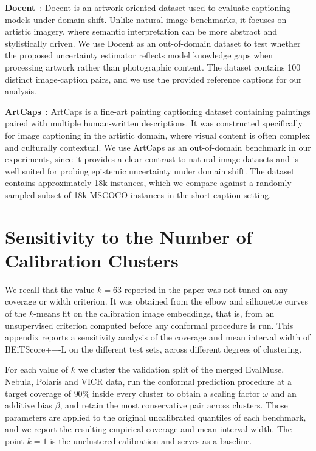 \documentclass[11pt]{article}
\begin{document}
\textbf{Docent}~\cite{ananthram2025posh}:
Docent is an artwork-oriented dataset used to evaluate captioning models under domain shift. Unlike natural-image benchmarks, it focuses on artistic imagery, where semantic interpretation can be more abstract and stylistically driven. We use Docent as an out-of-domain dataset to test whether the proposed uncertainty estimator reflects model knowledge gaps when processing artwork rather than photographic content. The dataset contains 100 distinct image-caption pairs, and we use the provided reference captions for our analysis.

\textbf{ArtCaps}~\cite{lu2022artcap}:
ArtCaps is a fine-art painting captioning dataset containing paintings paired with multiple human-written descriptions. It was constructed specifically for image captioning in the artistic domain, where visual content is often complex and culturally contextual. We use ArtCaps as an out-of-domain benchmark in our experiments, since it provides a clear contrast to natural-image datasets and is well suited for probing epistemic uncertainty under domain shift. The dataset contains approximately 18k instances, which we compare against a randomly sampled subset of 18k MSCOCO instances in the short-caption setting.

\section{Sensitivity to the Number of Calibration Clusters}
\label{app:cluster-sweep}

We recall that the value $k = 63$ reported in the paper was not tuned on any coverage or width criterion.
It was obtained from the elbow and silhouette curves of the $k$-means fit on the calibration image embeddings, that is, from an unsupervised criterion computed before any conformal procedure is run.
This appendix reports a sensitivity analysis of the coverage and mean interval width of BEiTScore++-L on the different test sets, across different degrees of clustering.


For each value of $k$ we cluster the validation split of the merged EvalMuse, Nebula, Polaris and VICR data, run the conformal prediction procedure at a target coverage of $90\%$ inside every cluster to obtain a scaling factor $\omega$ and an additive bias $\beta$, and retain the most conservative pair across clusters.
Those parameters are applied to the original uncalibrated quantiles of each benchmark, and we report the resulting empirical coverage and mean interval width.
The point $k = 1$ is the unclustered calibration and serves as a baseline.
\end{document}
